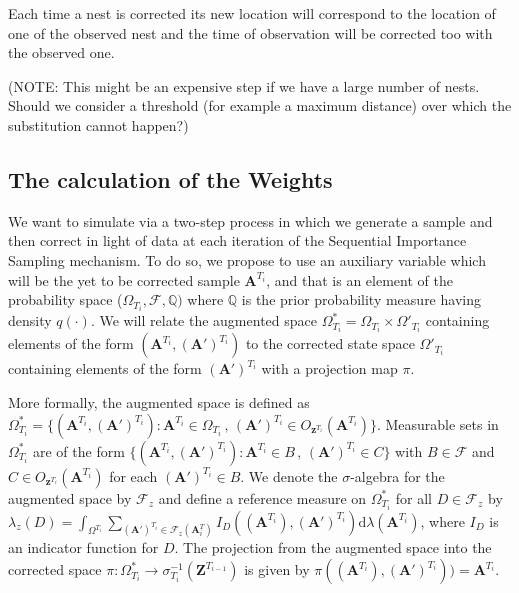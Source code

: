\documentclass{article}
\newcommand{\D}{\mathrm{d}}
\renewcommand{\vec}[1]{\mathbf{#1}}
\begin{document}
Each time a nest is corrected its new location will correspond to the location of one of the observed nest and the time of observation will be corrected too with the observed one.

(NOTE: This might be an expensive step if we have a large number of nests. Should we consider a threshold (for example a maximum distance) over which the substitution cannot happen?)



\subsection{The calculation of the Weights} \label{subsec:weight}

We want to simulate via a two-step process in which we generate a sample and then correct in light of data at each iteration of the Sequential Importance Sampling mechanism. To do so, we propose to use an auxiliary variable which will be the yet to be corrected sample $\vec{A}^{T_i}$, and that is an element of the probability space ($\Omega_{T_i}, \mathcal{F}, \mathbb{Q})$ where $\mathbb{Q}$ is the prior probability measure having density $q(\cdot)$. We will relate the augmented space $\Omega^*_{T_i} = \Omega_{T_i} \times \Omega'_{T_i}$ containing elements of the form $(\vec{A}^{T_i}, (\vec{A}')^{T_i})$ to the corrected state space $\Omega'_{T_i}$ containing elements of the form  $(\vec{A}')^{T_i}$ with a projection map $\pi$. 

More formally, the augmented space is defined as $\Omega^*_{T_i} = \{ (\vec{A}^{T_i}, (\vec{A}')^{T_i}) : \vec{A}^{T_i} \in \Omega_{T_i} \, , \, (\vec{A}')^{T_i} \in O_{\vec{z}^{T_i}} (\vec{A}^{T_i}) \}$. Measurable sets in $\Omega^*_{T_i}$ are of the form $\{ (\vec{A}^{T_i}, (\vec{A}')^{T_i}) : \vec{A}^{T_i} \in B \, , \, (\vec{A}')^{T_i} \in C \}$ with $B \in \mathcal{F}$ and $C \in O_{\vec{z}^{T_i}} (\vec{A}^{T_i})$ for each $(\vec{A}')^{T_i} \in B$. We denote the $\sigma$-algebra for the augmented space by $\mathcal{F}_z$ and define a reference measure on $\Omega^*_{T_i}$ for all $D \in \mathcal{F}_z$ by $\lambda_z(D) = \int_{\Omega^{T_i}} \sum_{(\vec{A}')^{T_i} \in \mathcal{F}_z(\vec{A}^T_i)} I_D((\vec{A}^{T_i}), (\vec{A}')^{T_i}) \D \lambda(\vec{A}^{T_i})$, where $I_D$ is an indicator function for $D$. The projection from the augmented space into the corrected space $\pi : \Omega^*_{T_i} \rightarrow \sigma^{-1}_{T_i}(\vec{Z}^{T_{i-1}})$ is given by $\pi((\vec{A}^{T_i}), (\vec{A}')^{T_i})) = \vec{A}^{T_i}$. 
\end{document}
